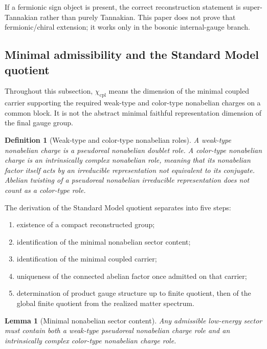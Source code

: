 \documentclass[11pt]{article}
\newtheorem{lemma}[theorem]{Lemma}
\newtheorem{definition}[theorem]{Definition}
\begin{document}
If a fermionic sign object is present, the correct reconstruction statement is super-Tannakian rather than purely Tannakian. This paper does not prove that fermionic/chiral extension; it works only in the bosonic internal-gauge branch.

\subsection{Minimal admissibility and the Standard Model quotient}

Throughout this subsection, $\chi_{\mathrm{cpl}}$ means the dimension of the minimal coupled carrier supporting the required weak-type and color-type nonabelian charges on a common block. It is not the abstract minimal faithful representation dimension of the final gauge group.

\begin{definition}[Weak-type and color-type nonabelian roles]
A weak-type nonabelian charge is a pseudoreal nonabelian doublet role. A color-type nonabelian charge is an intrinsically complex nonabelian role, meaning that its nonabelian factor itself acts by an irreducible representation not equivalent to its conjugate. Abelian twisting of a pseudoreal nonabelian irreducible representation does not count as a color-type role.
\end{definition}

The derivation of the Standard Model quotient separates into five steps:
\begin{enumerate}[leftmargin=2em]
\item existence of a compact reconstructed group;
\item identification of the minimal nonabelian sector content;
\item identification of the minimal coupled carrier;
\item uniqueness of the connected abelian factor once admitted on that carrier;
\item determination of product gauge structure up to finite quotient, then of the global finite quotient from the realized matter spectrum.
\end{enumerate}

\begin{lemma}[Minimal nonabelian sector content]\label{lem:mincontent}
Any admissible low-energy sector must contain both a weak-type pseudoreal nonabelian charge role and an intrinsically complex color-type nonabelian charge role.
\end{lemma}
\end{document}
